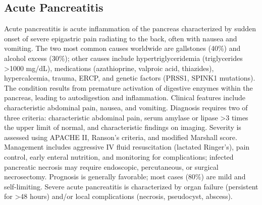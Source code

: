 



\label{sec:Pancreatitis}

\subsection{Acute Pancreatitis}
\label{sec:Acute Pancreatitis}
Acute pancreatitis is acute inflammation of the pancreas characterized by sudden onset of severe epigastric pain radiating to the back, often with nausea and vomiting. The two most common causes worldwide are gallstones (40\%) and alcohol excess (30\%); other causes include hypertriglyceridemia (triglycerides >1000 mg/dL), medications (azathioprine, valproic acid, thiazides), hypercalcemia, trauma, ERCP, and genetic factors (PRSS1, SPINK1 mutations). The condition results from premature activation of digestive enzymes within the pancreas, leading to autodigestion and inflammation. Clinical features include characteristic abdominal pain, nausea, and vomiting. Diagnosis requires two of three criteria: characteristic abdominal pain, serum amylase or lipase >3 times the upper limit of normal, and characteristic findings on imaging. Severity is assessed using APACHE II, Ranson's criteria, and modified Marshall score. Management includes aggressive IV fluid resuscitation (lactated Ringer's), pain control, early enteral nutrition, and monitoring for complications; infected pancreatic necrosis may require endoscopic, percutaneous, or surgical necrosectomy. Prognosis is generally favorable; most cases (80\%) are mild and self-limiting. Severe acute pancreatitis is characterized by organ failure (persistent for >48 hours) and/or local complications (necrosis, pseudocyst, abscess).

